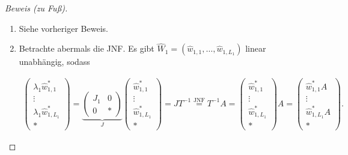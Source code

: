 \begin{proof}[Beweis (zu Fuß)]

    \phantom{}

    \begin{enumerate}[label = (\roman*)]

        \item Siehe vorheriger Beweis.

        \item Betrachte abermals die JNF.
        Es gibt $\hat W_1 = (\hat w_{1, 1}, \dots, \hat w_{1, L_1})$ linear unabhängig, sodass
        
        \begin{align*}
            \begin{pmatrix}
                \lambda_1 \hat w_{1,   1}^\ast \\
                \vdots                         \\
                \lambda_1 \hat w_{1, L_1}^\ast \\
                \ast
            \end{pmatrix}
            =
            \underbrace
            {
                \begin{pmatrix}
                    J_1 & 0 \\
                    0   & \ast
                \end{pmatrix}
            }_J
            \begin{pmatrix}
                \hat w_{1,   1}^\ast \\
                \vdots               \\
                \hat w_{1, L_1}^\ast \\
                \ast
            \end{pmatrix}
            =
            J T^{-1}
            \stackrel
            {
                \text{JNF}
            }{=}
            T^{-1} A
            =
            \begin{pmatrix}
                \hat w_{1,   1}^\ast \\
                \vdots               \\
                \hat w_{1, L_1}^\ast \\
                \ast
            \end{pmatrix}
            A
            =
            \begin{pmatrix}
                \hat w_{1,   1}^\ast A \\
                \vdots                 \\
                \hat w_{1, L_1}^\ast A \\
                \ast
            \end{pmatrix}.
        \end{align*}


\end{enumerate}
\end{proof}
